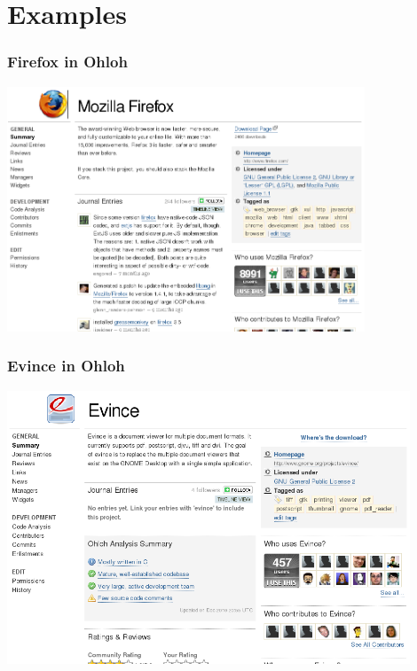 \documentclass{beamer}
\begin{document}
\section{Examples}

\begin{frame}
\frametitle{Firefox in Ohloh}
\begin{center}
\includegraphics[width=0.8\textwidth]{figs/ohloh-firefox.png}
\end{center}
\end{frame}

\begin{frame}
\frametitle{Evince in Ohloh}
\begin{center}
\includegraphics[width=0.9\textwidth]{figs/ohloh-evince.png}
\end{center}
\end{frame}
\end{document}
